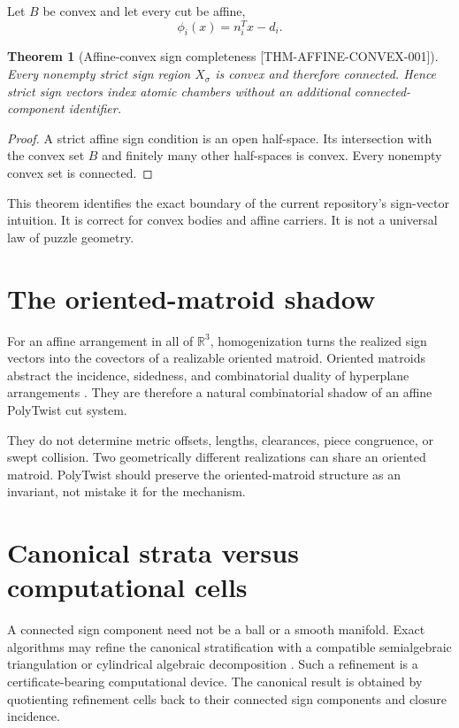 \documentclass[11pt,openany]{book}
\newcommand{\R}{\mathbb R}
\newcommand{\claimid}[1]{\textnormal{\sffamily\footnotesize[#1]}}
\theoremstyle{polyplain}
\newtheorem{theorem}{Theorem}[chapter]
\theoremstyle{polydef}
\begin{document}
Let $B$ be convex and let every cut be affine,
\[
\phi_i(x)=n_i^Tx-d_i.
\]

\begin{theorem}[Affine-convex sign completeness \claimid{THM-AFFINE-CONVEX-001}]
\label{thm:affine-convex-sign-completeness}
Every nonempty strict sign region $X_\sigma$ is convex and therefore connected. Hence strict sign vectors index atomic chambers without an additional connected-component identifier.
\end{theorem}

\begin{proof}
A strict affine sign condition is an open half-space. Its intersection with the convex set $B$ and finitely many other half-spaces is convex. Every nonempty convex set is connected.
\end{proof}

This theorem identifies the exact boundary of the current repository's sign-vector intuition. It is correct for convex bodies and affine carriers. It is not a universal law of puzzle geometry.

\section{The oriented-matroid shadow}
\label{sec:oriented-matroid-shadow}

For an affine arrangement in all of $\R^3$, homogenization turns the realized sign vectors into the covectors of a realizable oriented matroid. Oriented matroids abstract the incidence, sidedness, and combinatorial duality of hyperplane arrangements \parencite{FolkmanLawrence1978}. They are therefore a natural combinatorial shadow of an affine PolyTwist cut system.

They do not determine metric offsets, lengths, clearances, piece congruence, or swept collision. Two geometrically different realizations can share an oriented matroid. PolyTwist should preserve the oriented-matroid structure as an invariant, not mistake it for the mechanism.

\section{Canonical strata versus computational cells}
\label{sec:canonical-stratification}

A connected sign component need not be a ball or a smooth manifold. Exact algorithms may refine the canonical stratification with a compatible semialgebraic triangulation or cylindrical algebraic decomposition \parencite{BochnakCosteRoy1998,ArnonCollinsMcCallum1984}. Such a refinement is a certificate-bearing computational device. The canonical result is obtained by quotienting refinement cells back to their connected sign components and closure incidence.
\end{document}
